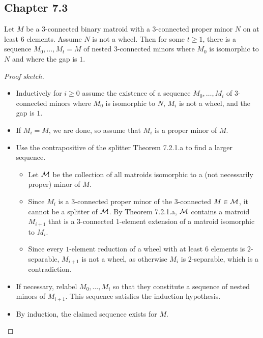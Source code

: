 \subsection{Chapter 7.3}

\begin{theorem}[7.3.1.a]
  \label{thm:7.3.1.a}
  Let $M$ be a $3$-connected binary matroid with a $3$-connected proper minor $N$ on at least $6$ elements. Assume $N$ is not a wheel.
  Then for some $t \geq 1$, there is a sequence $M_{0}, \dots, M_{t} = M$ of nested $3$-connected minors where $M_{0}$ is isomorphic to $N$ and where the gap is $1$.
\end{theorem}

\begin{proof}[Proof sketch]
  \begin{itemize}
    \item Inductively for $i \geq 0$ assume the existence of a sequence $M_{0}, \dots, M_{i}$ of $3$-connected minors where $M_{0}$ is isomorphic to $N$, $M_{i}$ is not a wheel, and the gap is $1$.
    \item If $M_{i} = M$, we are done, so assume that $M_{i}$ is a proper minor of $M$.
    \item Use the contrapositive of the splitter Theorem 7.2.1.a to find a larger sequence.
    \begin{itemize}
      \item Let $\mathcal{M}$ be the collection of all matroids isomorphic to a (not necessarily proper) minor of $M$.
      \item Since $M_{i}$ is a $3$-connected proper minor of the $3$-connected $M \in \mathcal{M}$, it cannot be a splitter of $\mathcal{M}$. By Theorem 7.2.1.a, $\mathcal{M}$ contains a matroid $M_{i + 1}$ that is a $3$-connected $1$-element extension of a matroid isomorphic to $M_{i}$.
      \item Since every $1$-element reduction of a wheel with at least $6$ elements is $2$-separable, $M_{i + 1}$ is not a wheel, as otherwise $M_{i}$ is $2$-separable, which is a contradiction.
    \end{itemize}
    \item If necessary, relabel $M_{0}, \dots, M_{i}$ so that they constitute a sequence of nested minors of $M_{i + 1}$. This sequence satisfies the induction hypothesis.
    \item By induction, the claimed sequence exists for $M$.
  \end{itemize}
\end{proof}

